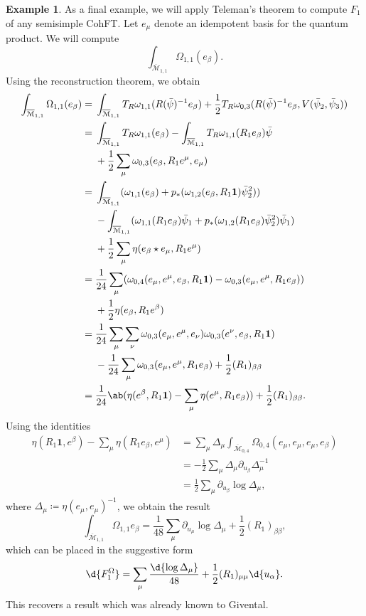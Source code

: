 \documentclass[10pt]{amsart}
\theoremstyle{definition}
\newtheorem{exm}[thm]{Example}
\theoremstyle{remark}
\theoremstyle{plain}
\theoremstyle{definition}
\theoremstyle{remark}
\newcommand{\Mbar}{\overline{\mathcal{M}}}
\newcommand{\1}{\mathbf{1}}
\newcommand{\2}{\mathbf{2}}
\newcommand{\3}{\mathbf{3}}
\begin{document}
\begin{exm}
    As a final example, we will apply Teleman's theorem to compute $F_1$ of any semisimple CohFT. Let $e_{\mu}$ denote an idempotent basis for the quantum product. We will compute
    \[ \int_{\Mbar_{1,1}} \Omega_{1,1}(e_{\beta}). \]
    Using the reconstruction theorem, we obtain
    \begin{align*}
        \int_{\Mbar_{1,1}}\Omega_{1,1}(e_{\beta}) ={}& \int_{\Mbar_{1,1}} T_R \omega_{1,1}(R(\bar{\psi})^{-1} e_{\beta}) + \frac{1}{2} T_R \omega_{0,3}(R(\bar{\psi})^{-1} e_{\beta}, V(\bar{\psi}_2, \bar{\psi}_3)) \\
        ={}& \int_{\Mbar_{1,1}}T_R\omega_{1,1}(e_{\beta}) - \int_{\Mbar_{1,1}} T_R \omega_{1,1}(R_1 e_{\beta})\bar{\psi} \\ 
        &+ \frac{1}{2}\sum_{\mu}  \omega_{0,3}(e_{\beta}, R_1 e^{\mu}, e_{\mu}) \\
        ={}& \int_{\Mbar_{1,1}} ( \omega_{1,1}(e_{\beta}) + p_* ( \omega_{1,2}(e_{\beta}, R_1 \1) \bar{\psi}_2^2 )) \\
        &- \int_{\Mbar_{1,1}} (\omega_{1,1}(R_1 e_{\beta})\bar{\psi}_1 + p_* ( \omega_{1,2}(R_1 e_{\beta}) \bar{\psi}_2^2 ) \bar{\psi}_1) \\
        &+ \frac{1}{2} \sum_{\mu} \eta(e_{\beta} \star e_{\mu}, R_1 e^{\mu}) \\
        ={}& \frac{1}{24} \sum_{\mu} ( \omega_{0,4}(e_{\mu}, e^{\mu}, e_{\beta}, R_1 \1) -\omega_{0,3}(e_{\mu}, e^{\mu}, R_1 e_{\beta}) )\\
        &+ \frac{1}{2} \eta(e_{\beta}, R_1 e^{\beta}) \\
        ={}& \frac{1}{24} \sum_{\mu}\sum_{\nu} \omega_{0,3}(e_{\mu}, e^{\mu}, e_{\nu})\omega_{0,3}(e^{\nu}, e_{\beta}, R_1 \1) \\
        &-\frac{1}{24} \sum_{\mu} \omega_{0,3}(e_{\mu}, e^{\mu}, R_1 e_{\beta}) + \frac{1}{2} (R_1)_{\beta\beta} \\
        ={}& \frac{1}{24} \ab(\eta(e^{\beta}, R_1 \1) - \sum_{\mu} \eta(e^{\mu}, R_1 e_{\beta})) + \frac{1}{2} (R_1)_{\beta\beta}.
    \end{align*}
    Using the identities
    \begin{align*}
        \eta(R_1 \1, e^{\beta}) - \sum_{\mu} \eta(R_1 e_{\beta}, e^{\mu}) &= \sum_{\mu} \Delta_{\mu} \int_{\Mbar_{0,4}} \Omega_{0,4}(e_{\mu}, e_{\mu}, e_{\mu}, e_{\beta}) \\
        &= -\frac{1}{2}\sum_{\mu} \Delta_{\mu} \partial_{u_{\beta}} \Delta_{\mu}^{-1} \\
        &= \frac{1}{2} \sum_{\mu} \partial_{u_{\beta}} \log \Delta_{\mu},
    \end{align*}
    where $\Delta_{\mu} \coloneqq \eta(e_{\mu}, e_{\mu})^{-1}$, we obtain the result
    \[ \int_{\Mbar_{1,1}} \Omega_{1,1} e_{\beta} = \frac{1}{48} \sum_{\mu} \partial_{u_{\mu}} \log \Delta_{\mu} + \frac{1}{2} (R_1)_{\beta\beta}, \]
    which can be placed in the suggestive form
    \[ \d{F_1^{\Omega}} = \sum_{\mu} \frac{\d{\log \Delta_{\mu}}}{48} + \frac{1}{2} (R_1)_{\mu\mu} \d{u_{\alpha}}. \]
    This recovers a result which was already known to Givental.
\end{exm}
\end{document}
